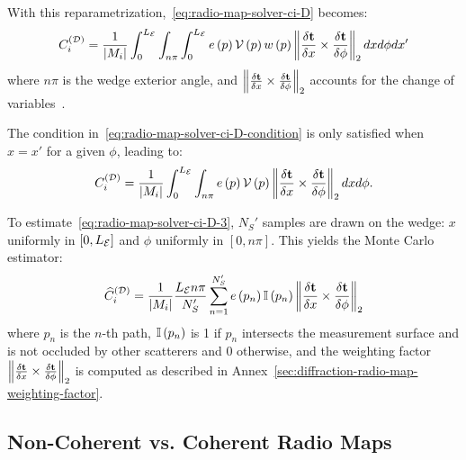 With this reparametrization,~\eqref{eq:radio-map-solver-ci-D} becomes:
\begin{equation}
    \label{eq:radio-map-solver-ci-D-2}
    C_i^{({\cal D})} = \frac{1}{\left| M_i \right|} \int_{0}^{L_{{\cal E}}} \int_{n\pi} \int_{0}^{L_{{\cal E}}} e \left( p \right) {\cal V}\left( p \right) w \left( p \right) \left\lVert \frac{\delta \mathbf{t}}{\delta x} \times \frac{\delta \mathbf{t}}{\delta \phi} \right\rVert_2 dx d\phi dx'
\end{equation}
where $n\pi$ is the wedge exterior angle, and $\left\lVert \frac{\delta \mathbf{t}}{\delta x} \times \frac{\delta \mathbf{t}}{\delta \phi} \right\rVert_2$ accounts for the change of variables~\cite{Wikipedia_Surface_Integral}.

The condition in~\eqref{eq:radio-map-solver-ci-D-condition} is only satisfied when $x = x'$ for a given $\phi$, leading to:
\begin{equation}
    \label{eq:radio-map-solver-ci-D-3}
    C_i^{({\cal D})} = \frac{1}{\left| M_i \right|} \int_{0}^{L_{{\cal E}}} \int_{n\pi} e \left( p \right) {\cal V}\left( p \right) \left\lVert \frac{\delta \mathbf{t}}{\delta x} \times \frac{\delta \mathbf{t}}{\delta \phi} \right\rVert_2 dx d\phi.
\end{equation}

To estimate~\eqref{eq:radio-map-solver-ci-D-3}, $N_S'$ samples are drawn on the wedge: $x$ uniformly in $[0, L_{{\cal E}}]$ and $\phi$ uniformly in $[0, n\pi]$. This yields the Monte Carlo estimator:
\begin{equation}
    \label{eq:radio-map-solver-ci-D-est}
    \widehat{C}_i^{({\cal D})} = \frac{1}{\left| M_i \right|} \frac{L_{{\cal E}}n\pi}{N_S'}\sum_{n=1}^{N_S'} e \left( p_n \right) \mathbb{I}\left( p_n \right) \left\lVert \frac{\delta \mathbf{t}}{\delta x} \times \frac{\delta \mathbf{t}}{\delta \phi} \right\rVert_2
\end{equation}
where $p_n$ is the $n$-th path, $\mathbb{I}\left( p_n \right)$ is 1 if $p_n$ intersects the measurement surface and is not occluded by other scatterers and 0 otherwise, and the weighting factor $\left\lVert \frac{\delta \mathbf{t}}{\delta x} \times \frac{\delta \mathbf{t}}{\delta \phi} \right\rVert_2$ is computed as described in Annex~\ref{sec:diffraction-radio-map-weighting-factor}.

\subsection{Non-Coherent vs. Coherent Radio Maps}

